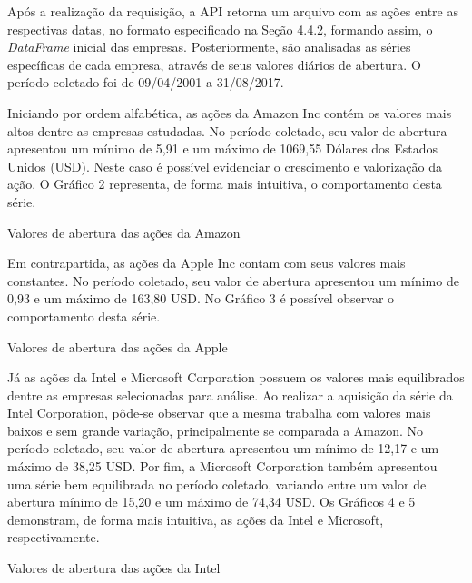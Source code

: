 Após a realização da requisição, a API retorna um arquivo com as ações entre as respectivas datas, no formato especificado na Seção 4.4.2, formando assim, o \textit{DataFrame} inicial das empresas. Posteriormente, são analisadas as séries específicas de cada empresa, através de seus valores diários de abertura. O período coletado foi de 09/04/2001 a 31/08/2017.

Iniciando por ordem alfabética, as ações da Amazon Inc contém os valores mais altos dentre as empresas estudadas. No período coletado, seu valor de abertura apresentou um mínimo de 5,91 e um máximo de 1069,55 Dólares dos Estados Unidos (USD). Neste caso é possível evidenciar o crescimento e valorização da ação. O Gráfico 2 representa, de forma mais intuitiva, o comportamento desta série.
\begin{grafico}[h]
	\centering
	\caption{Valores de abertura das ações da Amazon}
	\label{lingua}
\end{grafico}

Em contrapartida, as ações da Apple Inc contam com seus valores mais constantes. No período coletado, seu valor de abertura apresentou um mínimo de 0,93 e um máximo de 163,80 USD. No Gráfico 3 é possível observar o comportamento desta série.

\begin{grafico}[h]
	\centering
	\caption{Valores de abertura das ações da Apple}
	\label{lingua}
\end{grafico}

Já as ações da Intel e Microsoft Corporation possuem os valores mais equilibrados dentre as empresas selecionadas para análise. Ao realizar a aquisição da série da Intel Corporation, pôde-se observar que a mesma trabalha com valores mais baixos e sem grande variação, principalmente se comparada a Amazon. No período coletado, seu valor de abertura apresentou um mínimo de 12,17 e um máximo de 38,25 USD. Por fim, a Microsoft Corporation também apresentou uma série bem equilibrada no período coletado, variando entre um valor de abertura mínimo de 15,20 e um máximo de 74,34 USD. Os Gráficos 4 e 5 demonstram, de forma mais intuitiva, as ações da Intel e Microsoft, respectivamente. 	

\begin{grafico}[h]
	\centering
	\caption{Valores de abertura das ações da Intel}
	\label{lingua}
\end{grafico}

